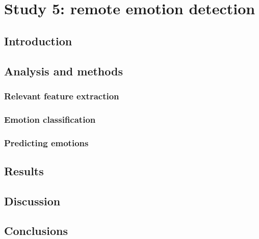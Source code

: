\section{Study 5: remote emotion detection}
\label{s:study5}

\subsection{Introduction}
\subsection{Analysis and methods}
  \subsubsection{Relevant feature extraction}
  \subsubsection{Emotion classification}
  \subsubsection{Predicting emotions}
\subsection{Results}
\subsection{Discussion}
\subsection{Conclusions}
